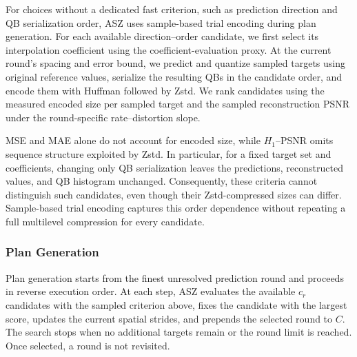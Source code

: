 For choices without a dedicated fast criterion, such as prediction direction and QB serialization order, ASZ uses sample-based trial encoding during plan generation. For each available direction--order candidate, we first select its interpolation coefficient using the coefficient-evaluation proxy. At the current round's spacing and error bound, we predict and quantize sampled targets using original reference values, serialize the resulting QBs in the candidate order, and encode them with Huffman followed by Zstd. We rank candidates using the measured encoded size per sampled target and the sampled reconstruction PSNR under the round-specific rate--distortion slope.

MSE and MAE alone do not account for encoded size, while $H_1$--PSNR omits sequence structure exploited by Zstd. In particular, for a fixed target set and coefficients, changing only QB serialization leaves the predictions, reconstructed values, and QB histogram unchanged. Consequently, these criteria cannot distinguish such candidates, even though their Zstd-compressed sizes can differ. Sample-based trial encoding captures this order dependence without repeating a full multilevel compression for every candidate.


\subsubsection{Plan Generation}

Plan generation starts from the finest unresolved prediction round and proceeds in reverse execution order. At each step, ASZ evaluates the available $c_r$ candidates with the sampled criterion above, fixes the candidate with the largest score, updates the current spatial strides, and prepends the selected round to $C$. The search stops when no additional targets remain or the round limit is reached. Once selected, a round is not revisited.

